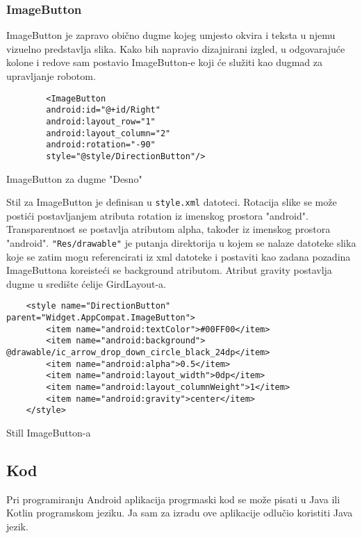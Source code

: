\documentclass[../Document.tex]{subfiles}
\begin{document}
\subsubsection{ImageButton}
ImageButton je zapravo obično dugme kojeg umjesto okvira i teksta u njemu vizuelno predstavlja slika. Kako bih napravio dizajnirani izgled, u odgovarajuće kolone i redove sam postavio ImageButton-e koji će služiti kao dugmad za upravljanje robotom.


\begin{code}
    \begin{verbatim}
        <ImageButton
        android:id="@+id/Right"
        android:layout_row="1"
        android:layout_column="2"
        android:rotation="-90"
        style="@style/DirectionButton"/>
    \end{verbatim}
    \caption{ImageButton za dugme "Desno"}
\end{code}

\vspace{0.5cm}
\noindent Stil za ImageButton je definisan u \verb|style.xml| datoteci. Rotacija slike se može postići postavljanjem atributa rotation iz imenskog prostora "android". Transparentnost se postavlja atributom alpha, također iz imenskog prostora "android". \verb|"Res/drawable"| je putanja direktorija u kojem se nalaze datoteke slika koje se zatim mogu referencirati iz xml datoteke i postaviti kao zadana pozadina ImageButtona koreisteći se background atributom. Atribut gravity postavlja dugme u središte ćelije GirdLayout-a.\\

\begin{code}
    \begin{verbatim}
    <style name="DirectionButton" parent="Widget.AppCompat.ImageButton">
        <item name="android:textColor">#00FF00</item>
        <item name="android:background"> @drawable/ic_arrow_drop_down_circle_black_24dp</item>
        <item name="android:alpha">0.5</item>
        <item name="android:layout_width">0dp</item>
        <item name="android:layout_columnWeight">1</item>
        <item name="android:gravity">center</item>
    </style>
    \end{verbatim}
    \caption{Still ImageButton-a}
\end{code}

\subsection{Kod}
Pri programiranju Android aplikacija progrmaski  kod se može pisati u Java ili Kotlin programskom jeziku. Ja sam za izradu ove aplikacije odlučio koristiti Java jezik.
\end{document}
